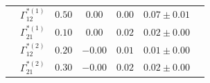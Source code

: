 \begin{table}[t]
{\begin{tabular}{ccccccc}
                             & $\Gamma^{*(1)}_{12}$          & $0.50$                         & $0.00$                   & $0.00$                           & $0.07 \pm 0.01$                             \\
                             & $\Gamma^{*(1)}_{21}$          & $0.10$                         & $0.00$                   & $0.02$                           & $0.02 \pm 0.00$                             \\
                             & $\Gamma^{*(2)}_{12}$          & $0.20$                         & $-0.00$                   & $0.01$                           & $0.01 \pm 0.00$                             \\
                             & $\Gamma^{*(2)}_{21}$          & $0.30$                         & $-0.00$                   & $0.02$                           & $0.02 \pm 0.00$                             \\ \hline

\end{tabular}
}
\label{table:Gamma}
\end{table}